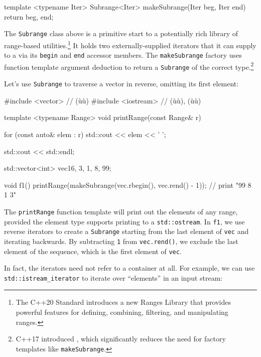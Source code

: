 {{\begin{emcppslisting}[emcppsbatch=e2]
template <typename Iter>
Subrange<Iter> makeSubrange(Iter beg, Iter end) { return {beg, end}; }
\end{emcppslisting}


\noindent The \lstinline!Subrange! class above is a primitive start to a potentially
rich library of range-based utilities.{\cprotect\footnote{The C++20
Standard introduces a new Ranges Library that provides powerful
  features for defining, combining, filtering, and manipulating ranges.}}
It holds two externally-supplied iterators that it can supply to a
 via its \lstinline!begin! and
\lstinline!end! accessor members. The \lstinline!makeSubrange! factory uses
function template argument deduction to return a \lstinline!Subrange! of
the correct type.{\cprotect\footnote{C++17 introduced , which significantly reduces the need for
  factory templates like \lstinline!makeSubrange!.}}

Let's use \lstinline!Subrange! to traverse a vector in reverse, omitting
its first element:

\begin{emcppslisting}[emcppsbatch=e2]
#include <vector>    // (ù{}ù)
#include <iostream>  // (ù{}ù), (ù{}ù)

template <typename Range>
void printRange(const Range& r)
{
    for (const auto& elem : r)
    {
        std::cout << elem << ' ';
    }

    std::cout << std::endl;
}

std::vector<int> vec{16, 3, 1, 8, 99};

void f1()
{
    printRange(makeSubrange(vec.rbegin(), vec.rend() - 1));
        // print "99 8 1 3"
}
\end{emcppslisting}


\noindent The \lstinline!printRange! function template will print out the elements of
any range, provided the element type supports printing to a
\lstinline!std::ostream!. In \lstinline!f1!, we use reverse iterators to
create a \lstinline!Subrange! starting from the last element of
\lstinline!vec! and iterating backwards. By subtracting \lstinline!1! from
\lstinline!vec.rend()!, we exclude the last element of the sequence, which
is the first element of \lstinline!vec!.

In fact, the iterators need not refer to a container at all. For
example, we can use \lstinline!std::istream_iterator! to iterate over
``elements'' in an input stream:

}}
